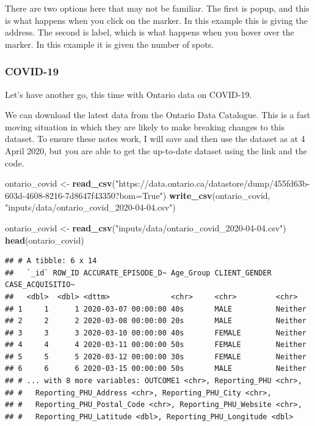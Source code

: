 \documentclass[
]{book}
\newenvironment{Shaded}{\begin{snugshade}}{\end{snugshade}}
\newcommand{\KeywordTok}[1]{\textcolor[rgb]{0.13,0.29,0.53}{\textbf{#1}}}
\newcommand{\NormalTok}[1]{#1}
\newcommand{\StringTok}[1]{\textcolor[rgb]{0.31,0.60,0.02}{#1}}
\begin{document}
There are two options here that may not be familiar. The first is popup, and this is what happens when you click on the marker. In this example this is giving the address. The second is label, which is what happens when you hover over the marker. In this example it is given the number of spots.

\hypertarget{covid-19}{%
\subsubsection{COVID-19}\label{covid-19}}

Let's have another go, this time with Ontario data on COVID-19.

We can download the latest data from the Ontario Data Catalogue. This is a fast moving situation in which they are likely to make breaking changes to this dataset. To ensure these notes work, I will save and then use the dataset as at 4 April 2020, but you are able to get the up-to-date dataset using the link and the code.

\begin{Shaded}
\begin{Highlighting}[]
\NormalTok{ontario_covid <-}\StringTok{ }\KeywordTok{read_csv}\NormalTok{(}\StringTok{"https://data.ontario.ca/datastore/dump/455fd63b-603d-4608-8216-7d8647f43350?bom=True"}\NormalTok{)}
\KeywordTok{write_csv}\NormalTok{(ontario_covid, }\StringTok{"inputs/data/ontario_covid_2020-04-04.csv"}\NormalTok{)}
\end{Highlighting}
\end{Shaded}

\begin{Shaded}
\begin{Highlighting}[]
\NormalTok{ontario_covid <-}\StringTok{ }\KeywordTok{read_csv}\NormalTok{(}\StringTok{"inputs/data/ontario_covid_2020-04-04.csv"}\NormalTok{)}
\KeywordTok{head}\NormalTok{(ontario_covid)}
\end{Highlighting}
\end{Shaded}

\begin{verbatim}
## # A tibble: 6 x 14
##   `_id` ROW_ID ACCURATE_EPISODE_D~ Age_Group CLIENT_GENDER CASE_ACQUISITIO~
##   <dbl>  <dbl> <dttm>              <chr>     <chr>         <chr>           
## 1     1      1 2020-03-07 00:00:00 40s       MALE          Neither         
## 2     2      2 2020-03-08 00:00:00 20s       MALE          Neither         
## 3     3      3 2020-03-10 00:00:00 40s       FEMALE        Neither         
## 4     4      4 2020-03-11 00:00:00 50s       FEMALE        Neither         
## 5     5      5 2020-03-12 00:00:00 30s       FEMALE        Neither         
## 6     6      6 2020-03-15 00:00:00 50s       MALE          Neither         
## # ... with 8 more variables: OUTCOME1 <chr>, Reporting_PHU <chr>,
## #   Reporting_PHU_Address <chr>, Reporting_PHU_City <chr>,
## #   Reporting_PHU_Postal_Code <chr>, Reporting_PHU_Website <chr>,
## #   Reporting_PHU_Latitude <dbl>, Reporting_PHU_Longitude <dbl>
\end{verbatim}
\end{document}
